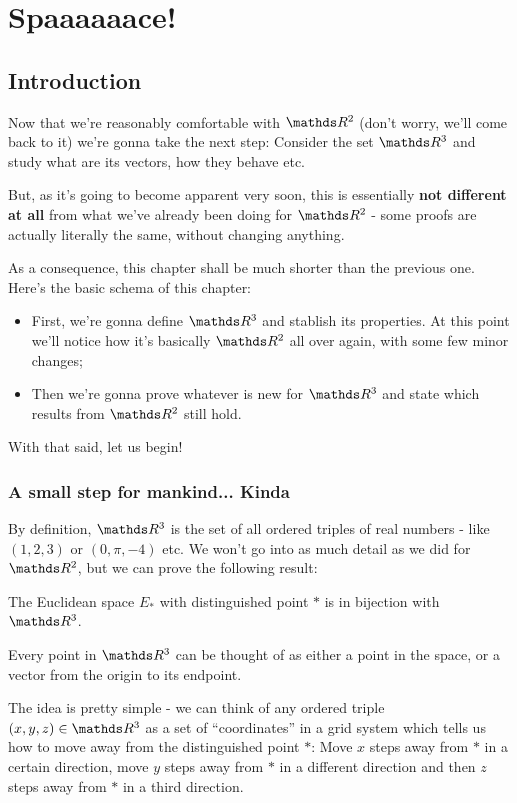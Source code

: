 \chapter{Spaaaaaace!}
\section{Introduction}

Now that we're reasonably comfortable with $\R^2$ (don't worry, we'll come back to it) we're gonna take the next step: Consider the set $\R^3$ and study what are its vectors, how they behave etc.

But, as it's going to become apparent very soon, this is essentially \textbf{not different at all} from what we've already been doing for $\R^2$ - some proofs are actually literally the same, without changing anything.

As a consequence, this chapter shall be much shorter than the previous one. Here's the basic schema of this chapter:

\begin{itemize}
	\item First, we're gonna define $\R^3$ and stablish its properties. At this point we'll notice how it's basically $\R^2$ all over again, with some few minor changes;
	\item Then we're gonna prove whatever is new for $\R^3$ and state which results from $\R^2$ still hold.
\end{itemize}

With that said, let us begin!

\newpage
\subsection{A small step for mankind... Kinda}

By definition, $\R^3$ is the set of all ordered triples of real numbers - like $(1,2,3)$ or $(0,\pi, -4)$ etc. We won't go into as much detail as we did for $\R^2$, but we can prove the following result:

\begin{prop}
	The Euclidean space $E_*$ with distinguished point $*$ is in bijection with $\R^3$.
\end{prop}
\begin{cor}
	Every point in $\R^3$ can be thought of as either a point in the space, or a vector from the origin to its endpoint.
\end{cor}

The idea is pretty simple - we can think of any ordered triple $(x,y,z)\in \R^3$ as a set of ``coordinates'' in a grid system which tells us how to move away from the distinguished point $*$: Move $x$ steps away from $*$ in a certain direction, move $y$ steps away from $*$ in a different direction and then $z$ steps away from $*$ in a third direction.

